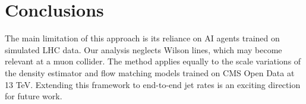 \section{Conclusions}\label{sec:conclusions}

The main limitation of this approach is its reliance on AI agents
trained on simulated LHC data. Our analysis neglects Wilson lines, which
may become relevant at a muon collider. The method applies equally to
the scale variations of the density estimator and flow matching models
trained on CMS Open Data at 13 TeV. Extending this framework to
end-to-end jet rates is an exciting direction for future work.


